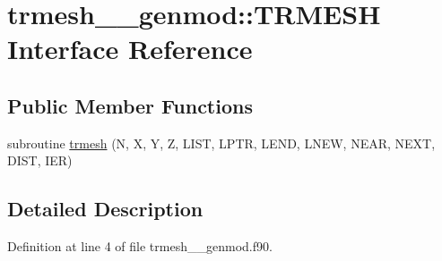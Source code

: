 \hypertarget{interfacetrmesh____genmod_1_1TRMESH}{\section{trmesh\+\_\+\+\_\+genmod\+:\+:T\+R\+M\+E\+S\+H Interface Reference}
\label{interfacetrmesh____genmod_1_1TRMESH}
}
\subsection*{Public Member Functions}
\begin{DoxyCompactItemize}
\item 
subroutine \hyperlink{interfacetrmesh____genmod_1_1TRMESH_aebfe49c8c5c1876b6b027faa81d11271}{trmesh} (N, X, Y, Z, L\+I\+S\+T, L\+P\+T\+R, L\+E\+N\+D, L\+N\+E\+W, N\+E\+A\+R, N\+E\+X\+T, D\+I\+S\+T, I\+E\+R)
\end{DoxyCompactItemize}


\subsection{Detailed Description}


Definition at line 4 of file trmesh\+\_\+\+\_\+genmod.\+f90.



